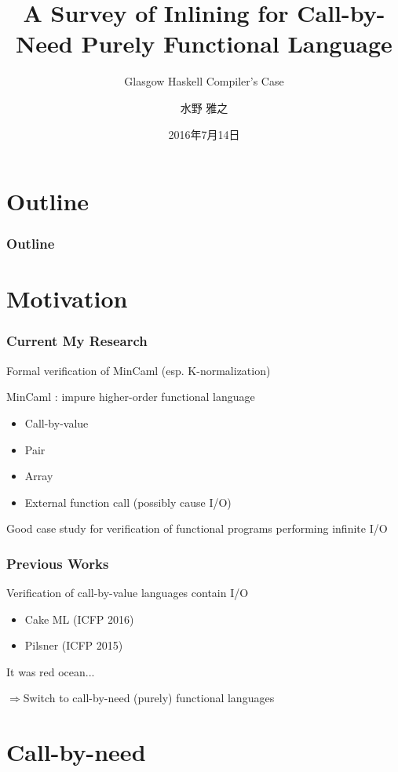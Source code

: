 \documentclass[dvipdfmx,cjk,xcolor=dvipsnames,envcountsect,notheorems,12pt]{beamer}
\title{A Survey of Inlining for Call-by-Need Purely Functional Language}
\subtitle{Glasgow Haskell Compiler's Case}
\author{水野 雅之}
\institute[東北大学　住井・松田研]{東北大学 大学院情報科学研究科\\住井・松田研究室}%
\date{2016年7月14日}
\theoremstyle{definition}
\begin{document}
\frame[plain]{\titlepage}%

\section*{Outline}

\begin{frame}
  \frametitle{Outline}
  \tableofcontents[sectionstyle=show,subsectionstyle=hide]
\end{frame}

\section{Motivation}

\begin{frame}
	\frametitle{Current My Research}
	\large
	Formal verification of MinCaml (esp. K-normalization)
	
	\vfill

	MinCaml : impure higher-order functional language
	\begin{itemize}
		\item Call-by-value
		\item Pair
		\item Array
		\item External function call (possibly cause I/O)
	\end{itemize}

	\vfill

	Good case study for verification of functional programs performing infinite I/O
\end{frame}

\begin{frame}
	\frametitle{Previous Works}
	\large
	Verification of call-by-value languages contain I/O
	\begin{itemize}
		\item Cake ML (ICFP 2016)
		\item Pilsner (ICFP 2015)
	\end{itemize}

	\vfill

	It was red ocean...

	\vfill

	$\Rightarrow$Switch to call-by-need (purely) functional languages
\end{frame}

\section{Call-by-need}
\end{document}
